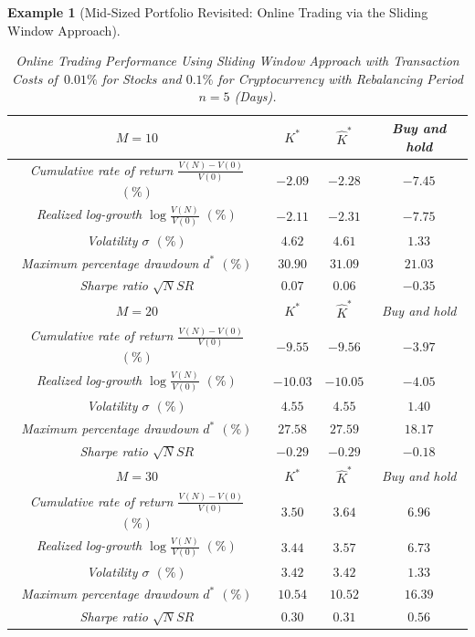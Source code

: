 \documentclass[10pt]{article} %
\newtheorem{example}{Example}[section]
\begin{document}
\begin{example}[Mid-Sized Portfolio Revisited: Online Trading via the Sliding Window Approach]
		\begin{table}[h!] 
			\centering
			\caption{Online Trading Performance Using Sliding Window Approach with Transaction Costs of~$0.01\%$ for Stocks and $0.1\%$ for Cryptocurrency with Rebalancing Period $n=5$ (Days).} 
			\begin{tabular}{|c|c|c|c|}
				\hline
				$M=10$& $K^*$ & $\widehat{K}^*$ & Buy and hold \\
				\hline
				Cumulative rate of return $\frac{V(N)-V(0)}{V(0)}$ $(\%)$ & $-2.09$ & $-2.28$ & $-7.45$ \\
				\hline
				Realized log-growth $\log\frac{V(N)}{V(0)}$ $(\%)$ & $-2.11$ & $-2.31$ & $-7.75$\\
				\hline
				Volatility $\sigma$ $(\%)$ & $4.62 $& $4.61$ & $1.33$\\
				\hline
				Maximum percentage drawdown $d^*$ $(\%)$ & $30.90$ & $31.09$ & $21.03$\\
				\hline
				Sharpe ratio $\sqrt{N}SR$ &  $0.07$ &  $0.06$ & $ -0.35 $\\
				\hline
				\hline
				\hline
				$M=20$ & $K^*$ & $\widehat{K}^*$ & Buy and hold \\
				\hline
				Cumulative rate of return $\frac{V(N)-V(0)}{V(0)}$ $(\%)$ & $-9.55$ & $-9.56$ & $-3.97$ \\
				\hline
				Realized log-growth $\log\frac{V(N)}{V(0)}$ $(\%)$ & $-10.03$ & $-10.05$ & $-4.05$\\
				\hline
				Volatility $\sigma$ $(\%)$ & $4.55$ & $4.55$ & $1.40$\\
				\hline
				Maximum percentage drawdown $d^*$ $(\%)$ & $27.58$ & $27.59$ & $18.17$\\
				\hline
				Sharpe ratio $\sqrt{N}SR$ & $ -0.29$ & $-0.29$ &  $-0.18$ \\
				\hline
				\hline
				\hline
				$M=30$ &$K^*$ & $\widehat{K}^*$ & Buy and hold \\
				\hline
				Cumulative rate of return $\frac{V(N)-V(0)}{V(0)}$ $(\%)$ & $3.50$ & $3.64$ & $6.96$ \\
				\hline
				Realized log-growth $\log\frac{V(N)}{V(0)}$ $(\%)$ & $3.44$ & $3.57$ & $6.73$\\
				\hline
				Volatility $\sigma$ $(\%)$ & $3.42$ & $3.42$ & $1.33$\\
				\hline
				Maximum percentage drawdown $d^*$ $(\%)$ & $10.54$ & $10.52$ & $16.39$\\
				\hline
				Sharpe ratio $\sqrt{N}SR$ & $0.30$ &  $0.31$ &  $0.56$ \\
				\hline
				\hline
			\end{tabular}
			\label{table: Descriptive Statistics Daily cost sliding window 0.01 (n=5)}
		\end{table}
		

\end{example}
\end{document}
